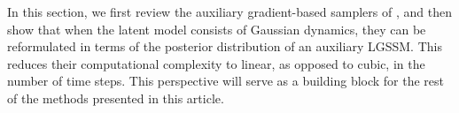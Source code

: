 In this section, we first review the auxiliary gradient-based samplers of \citet{titsias2018}, and then show that when the latent model consists of Gaussian dynamics, they can be reformulated in terms of the posterior distribution of an auxiliary LGSSM. This reduces their computational complexity to linear, as opposed to cubic, in the number of time steps. This perspective will serve as a building block for the rest of the methods presented in this article.